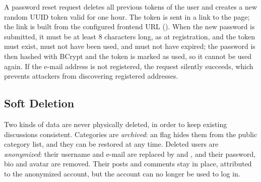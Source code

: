 A password reset request deletes all previous tokens of the user and creates a new
random UUID token valid for one hour. The token is sent in a link to the
 page; the link is built from the configured frontend URL
(). When the new password is submitted, it must be at least
8 characters long, as at registration, and the token must exist,
must not have been used, and must not have expired; the password is then hashed with
BCrypt and the token is marked as used, so it cannot be used again. If the e-mail address
is not registered, the request silently succeeds, which prevents attackers from
discovering registered addresses.

\subsection{Soft Deletion}

Two kinds of data are never physically deleted, in order to keep existing discussions
consistent. Categories are \emph{archived}: an  flag hides them from the
public category list, and they can be restored at any time. Deleted users are
\emph{anonymized}: their username and e-mail are replaced by
 and , and their password,
bio and avatar are removed. Their posts and comments stay in place, attributed to the
anonymized account, but the account can no longer be used to log in.
